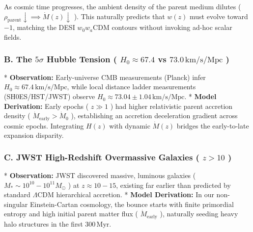\documentclass[11pt,a4paper]{article}
\theoremstyle{definition}
\theoremstyle{remark}
\begin{document}
As cosmic time progresses, the ambient density of the parent medium dilutes ( $\rho_{\text{parent}} \downarrow \implies \dot{M}(z) \downarrow$ ). This naturally predicts that $w(z)$ must evolve toward $-1$, matching the DESI $w_0 w_a\mathrm{CDM}$ contours without invoking ad-hoc scalar fields.

\subsubsection{B. The $5\sigma$ Hubble Tension ( $H_0 \approx 67.4$ vs $73.0 \, \mathrm{km/s/Mpc}$ )}
* \textbf{Observation:} Early-universe CMB measurements (Planck) infer $H_0 \approx 67.4 \, \mathrm{km/s/Mpc}$, while local distance ladder measurements (SH0ES/HST/JWST) observe $H_0 \approx 73.04 \pm 1.04 \, \mathrm{km/s/Mpc}$.
* \textbf{Model Derivation:} Early epochs ( $z \gg 1$ ) had higher relativistic parent accretion density ( $\dot{M}_{\text{early}} > \dot{M}_0$ ), establishing an accretion deceleration gradient across cosmic epochs. Integrating $H(z)$ with dynamic $\dot{M}(z)$ bridges the early-to-late expansion disparity.

\subsubsection{C. JWST High-Redshift Overmassive Galaxies ( $z > 10$ )}
* \textbf{Observation:} JWST discovered massive, luminous galaxies ( $M_* \sim 10^{10} - 10^{11} M_\odot$ ) at $z \approx 10 - 15$, existing far earlier than predicted by standard $\Lambda\mathrm{CDM}$ hierarchical accretion.
* \textbf{Model Derivation:} In our non-singular Einstein-Cartan cosmology, the bounce starts with finite primordial entropy and high initial parent matter flux ( $\dot{M}_{\text{early}}$ ), naturally seeding heavy halo structures in the first $300\,\mathrm{Myr}$.
\end{document}
